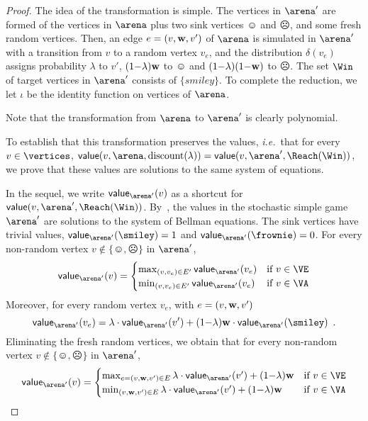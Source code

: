 \begin{proof}
  The idea of the transformation is simple. The vertices in $\arena'$
  are formed of the vertices in $\arena$ plus two sink vertices
  $\smiley$ and $\frownie$, and some fresh random vertices. Then, an
  edge $e = (v,\mathbf{w},v')$ of $\arena$ is simulated in $\arena'$ with
  a transition from $v$ to a random vertex $v_e$, and the distribution
  $\delta(v_e)$ assigns probability $\lambda$ to $v'$,
  $(1{-}\lambda)\mathbf{w}$ to $\smiley$ and $(1{-}\lambda)(1{-}\mathbf{w})$
  to $\frownie$. The set $\Win$ of target vertices in $\arena'$
  consists of $\{smiley\}$. To complete the reduction, we let $\iota$
  be the identity function on vertices of $\arena$.

  Note that the transformation from $\arena$ to $\arena'$ is clearly
  polynomial.


  To establish that this transformation preserves the values,
  \emph{i.e.}\ that for every $v \in \vertices$,
  $\mathsf{value}(v,\arena,\textrm{discount}(\lambda)) =
  \mathsf{value}(v,\arena',\Reach(\Win))$, we prove that these
  values are solutions to the same system of equations.

  In the sequel, we write $\mathsf{value}_{\arena'}(v)$ as a shortcut
  for $\mathsf{value}(v,\arena',\Reach(\Win))$.
  By~, the values in the stochastic simple game
  $\arena'$ are solutions to the system of Bellman equations. The sink
  vertices have trivial values, $\mathsf{value}_{\arena'}(\smiley) =1$
  and $\mathsf{value}_{\arena'}(\frownie) =0$.  For every non-random
  vertex $v \notin \{\smiley,\frownie\}$ in $\arena'$,
  \[
    \mathsf{value}_{\arena'}(v)
  = \begin{cases}   \max_{(v,v_e) \in E'}  \mathsf{value}_{\arena'}(v_e) & \text{if}\ v \in \VE \\
     \min_{(v,v_e) \in E'}  \mathsf{value}_{\arena'}(v_e)  & \text{if}\ v \in \VA
   \end{cases}
 \]
 Moreover, for every random vertex $v_e$, with $e=(v,\mathbf{w},v')$
 \[
   \mathsf{value}_{\arena'}(v_e) = \lambda \cdot
   \mathsf{value}_{\arena'}(v') + (1{-}\lambda) \weight \cdot
   \mathsf{value}_{\arena'}(\smiley) \enspace.
  \]
 Eliminating the fresh
  random vertices, we obtain that for every non-random vertex
  $v \notin \{\smiley,\frownie\}$ in $\arena'$,
  \[
    \mathsf{value}_{\arena'}(v) =
    \begin{cases}
      \max_{e=(v,\weight,v') \in E}  \lambda \cdot
   \mathsf{value}_{\arena'}(v') + (1{-}\lambda) \weight & \text{if}\ v \in \VE\\
      \min_{(v,\weight,v') \in E}  \lambda \cdot
   \mathsf{value}_{\arena'}(v') + (1{-}\lambda) \weight & \text{if}\ v \in \VA
   \end{cases}
    \]


\end{proof}
